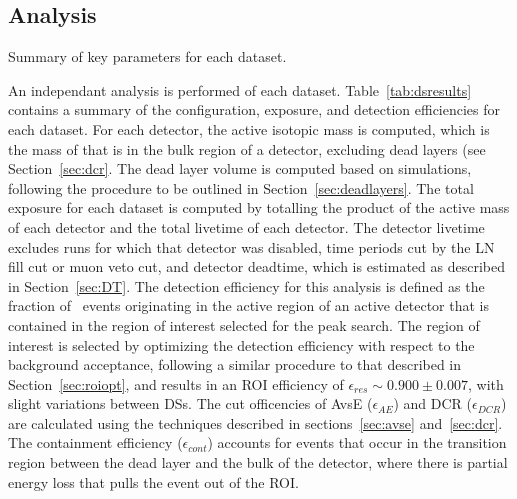 \documentclass[/main.tex]{subfiles}
\begin{document}
\subsection{Analysis}
\begin{table}[h]
  \centering
  \caption[Summary of datasets]{\label{tab:dsresults}
    Summary of key parameters for each dataset.
  }
  \footnotesize
  
\end{table}
An independant analysis is performed of each dataset.
Table~\ref{tab:dsresults} contains a summary of the configuration, exposure, and detection efficiencies for each dataset.
For each detector, the active isotopic mass is computed, which is the mass of  that is in the bulk region of a detector, excluding dead layers (see Section~\ref{sec:dcr}.
The dead layer volume is computed based on simulations, following the procedure to be outlined in Section~\ref{sec:deadlayers}.
The total exposure for each dataset is computed by totalling the product of the active mass of each detector and the total livetime of each detector.
The detector livetime excludes runs for which that detector was disabled, time periods cut by the LN fill cut or muon veto cut, and detector deadtime, which is estimated as described in Section~\ref{sec:DT}.
The detection efficiency for this analysis is defined as the fraction of \znbb\ events originating in the active region of an active detector that is contained in the region of interest selected for the peak search.
The region of interest is selected by optimizing the detection efficiency with respect to the background acceptance, following a similar procedure to that described in Section~\ref{sec:roiopt}, and results in an ROI efficiency of $\epsilon_{res}\sim0.900\pm0.007$, with slight variations between DSs.
The cut officencies of AvsE ($\epsilon_{AE}$) and DCR ($\epsilon_{DCR}$) are calculated using the techniques described in sections~\ref{sec:avse} and~\ref{sec:dcr}.
The containment efficiency ($\epsilon_{cont}$) accounts for events that occur in the transition region between the dead layer and the bulk of the detector, where there is partial energy loss that pulls the event out of the ROI.
\end{document}
